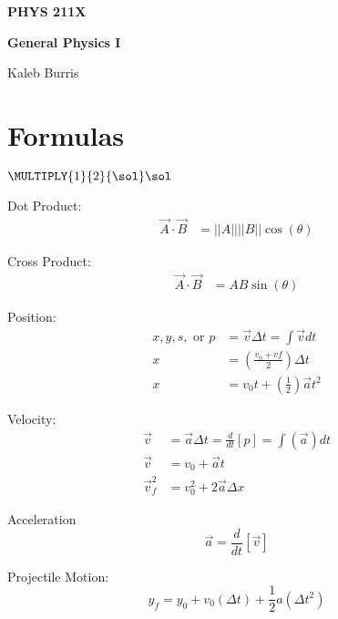 \documentclass[10pt, letterpaper]{book}
\begin{document}
    \begin{titlepage}
        \Huge \textbf{PHYS 211X}

        \huge \textbf{General Physics I}

        \vfill

        \Large Kaleb Burris
    \end{titlepage}

    \section*{Formulas}

    $\MULTIPLY{1}{2}{\sol}\sol$

    \begin{multicols*}{2}
        Dot Product:
        \begin{align}
            \vec{A}\cdot\vec{B} & = ||A|| ||B||\cos(\theta)
        \end{align}

        Cross Product:
        \begin{align}
            \vec{A}\cdot\vec{B} & = AB\sin(\theta)
        \end{align}

        Position:
        \begin{align}
            x, y, s, \text{ or } p  & = \vec{v}\Delta t = \int\vec{v}dt                     \\
                                 x  & = \left(\frac{v_{0}+v{f}}{2}\right)\Delta t           \\
                                 x  & = v_{0} t+\left(\frac{1}{2}\right)\vec{a} t^{2}       
        \end{align}

        Velocity:
        \begin{align}
            \vec{v}         & = \vec{a}\Delta t = \frac{d}{dt}[p] = \int(\vec{a})dt     \\
            \vec{v}         & = v_{0} + \vec{a}t                                        \\
            \vec{v}^{2}_{f} & = v^{2}_{0} + 2\vec{a}\Delta x                            
        \end{align}

        Acceleration
        \begin{equation}
            \vec{a} = \frac{d}{dt}[\vec{v}]
        \end{equation}

        Projectile Motion:
        \begin{equation}
            \label{eqn::yfinal}
            y_{f} = y_{0} + v_{0}(\Delta t) + \frac{1}{2}a(\Delta t^{2})
        \end{equation}


\end{multicols*}
\end{document}
